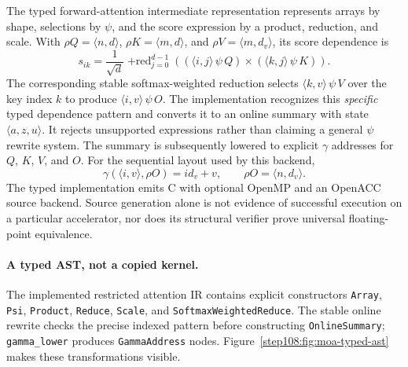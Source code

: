 \documentclass[11pt]{article}
\begin{document}
The typed forward-attention intermediate representation represents arrays by
shape, selections by $\psi$, and the score expression by a product, reduction,
and scale.  With
$\rho Q=\langle n,d\rangle$,
$\rho K=\langle m,d\rangle$, and
$\rho V=\langle m,d_v\rangle$, its score dependence is
\begin{equation}
  s_{ik}=\frac{1}{\sqrt d}
  \mathop{+\mathrm{red}}_{j=0}^{d-1}
  \left((\langle i,j\rangle\,\psi\,Q)
        \times(\langle k,j\rangle\,\psi\,K)\right).
  \label{step108:eq:moa-attention-score}
\end{equation}
The corresponding stable softmax-weighted reduction selects
$\langle k,v\rangle\,\psi\,V$ over the key index $k$ to produce
$\langle i,v\rangle\,\psi\,O$.
The implementation recognizes this \emph{specific} typed dependence pattern
and converts it to an online summary with state $\langle a,z,u\rangle$.
It rejects unsupported expressions rather than claiming a general $\psi$
rewrite system.  The summary is subsequently lowered to explicit $\gamma$
addresses for $Q$, $K$, $V$, and $O$.  For the sequential layout used by this
backend,
\begin{equation}
  \gamma(\langle i,v\rangle,\rho O)=i d_v+v,
  \qquad \rho O=\langle n,d_v\rangle.
  \label{step108:eq:moa-output-gamma}
\end{equation}
The typed implementation emits C with optional OpenMP and an OpenACC source
backend.  Source generation alone is not evidence of successful execution on a
particular accelerator, nor does its structural verifier prove universal
floating-point equivalence.


\paragraph{A typed AST, not a copied kernel.}
The implemented restricted attention IR contains explicit constructors
\texttt{Array}, \texttt{Psi}, \texttt{Product}, \texttt{Reduce},
\texttt{Scale}, and \texttt{SoftmaxWeightedReduce}.  The stable online
rewrite checks the precise indexed pattern before constructing
\texttt{OnlineSummary}; \texttt{gamma\_lower} produces
\texttt{GammaAddress} nodes.  Figure~\ref{step108:fig:moa-typed-ast}
makes these transformations visible.
\end{document}
